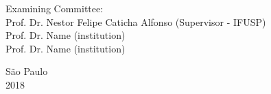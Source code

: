 \vskip 1.5cm

\noindent Examining Committee: \\
\noindent Prof. Dr. Nestor Felipe Caticha Alfonso (Supervisor - IFUSP)\\
Prof. Dr. Name (institution)\\
Prof. Dr. Name (institution)\\
\vspace{1.cm}

\begin{center}
	São Paulo \\ 2018
\end{center}

\clearpage

\restoregeometry


\newpage\null\thispagestyle{empty}\newpage

